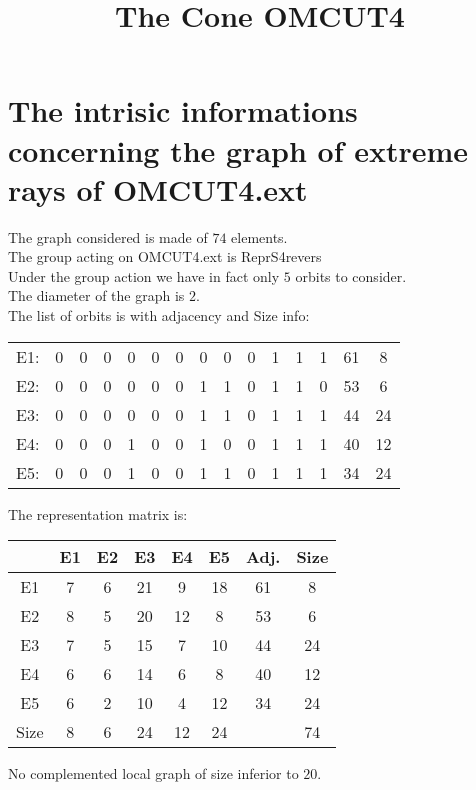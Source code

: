 \documentclass[12pt]{article}
\title{The Cone OMCUT4}
\begin{document}
\maketitle
\section{The intrisic informations concerning the graph of extreme rays of OMCUT4.ext}
The graph considered is made of $74$ elements.\\
The group acting on OMCUT4.ext is ReprS4revers\\
Under the group action we have in fact only $5$ orbits to consider.\\
The diameter of the graph is $2$.\\
The list of orbits is with adjacency and Size info:
\begin{center}
\scriptsize
\begin{tabular}{ccccccccccccc|c|c}
E1:&0&0&0&0&0&0&0&0&0&1&1&1&61&8\\
E2:&0&0&0&0&0&0&1&1&0&1&1&0&53&6\\
E3:&0&0&0&0&0&0&1&1&0&1&1&1&44&24\\
E4:&0&0&0&1&0&0&1&0&0&1&1&1&40&12\\
E5:&0&0&0&1&0&0&1&1&0&1&1&1&34&24\\
\end{tabular}
\end{center}
The representation matrix is:
\begin{center}
\scriptsize
\begin{tabular}{|c|ccccc|c|c|}
\hline
&E1&E2&E3&E4&E5&Adj.&Size\\
\hline
E1& 7& 6& 21& 9& 18&61&8\\
E2& 8& 5& 20& 12& 8&53&6\\
E3& 7& 5& 15& 7& 10&44&24\\
E4& 6& 6& 14& 6& 8&40&12\\
E5& 6& 2& 10& 4& 12&34&24\\
\hline
Size&8&6&24&12&24&&74\\
\hline
\end{tabular}
\end{center}
No complemented local graph of size inferior to $20$.
\end{document}
